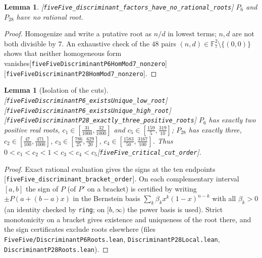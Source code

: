 \documentclass[10pt]{article}
\newtheorem{lemma}[theorem]{Lemma}
\theoremstyle{definition}
\theoremstyle{remark}
\newcommand{\F}{\mathbb{F}}
\newcommand{\leanref}[1]{{\scriptsize\textup{[\texttt{#1}]}}\allowbreak}
\newcommand{\leanfile}[1]{\texttt{\small #1}}
\begin{document}
\begin{lemma}\label{lem:norational}
\leanref{five\allowbreak Five\_\allowbreak discriminant\_\allowbreak factors\_\allowbreak have\_\allowbreak no\_\allowbreak rational\_\allowbreak roots}
$P_6$ and $P_{28}$ have no rational root.
\end{lemma}
\begin{proof}
Homogenize and write a putative root as $n/d$ in lowest terms; $n,d$ are not
both divisible by $7$.  An exhaustive check of the $48$ pairs
$(n,d)\in\F_7^2\setminus\{(0,0)\}$ shows that neither homogeneous form
vanishes\leanref{five\allowbreak Five\allowbreak Discriminant\allowbreak P6\allowbreak Hom\allowbreak Mod7\_\allowbreak nonzero} \leanref{five\allowbreak Five\allowbreak Discriminant\allowbreak P28\allowbreak Hom\allowbreak Mod7\_\allowbreak nonzero}.
\end{proof}

\begin{lemma}[Isolation of the cuts]\label{lem:cuts}
\leanref{five\allowbreak Five\allowbreak Discriminant\allowbreak P6\_\allowbreak exists\allowbreak Unique\_\allowbreak low\_\allowbreak root} \leanref{five\allowbreak Five\allowbreak Discriminant\allowbreak P6\_\allowbreak exists\allowbreak Unique\_\allowbreak high\_\allowbreak root} \leanref{five\allowbreak Five\allowbreak Discriminant\allowbreak P28\_\allowbreak exactly\_\allowbreak three\_\allowbreak positive\_\allowbreak roots}
$P_6$ has exactly two positive real roots, $c_1\in[\tfrac{31}{1000},\tfrac{32}{1000}]$
and $c_5\in[\tfrac{159}{5},\tfrac{319}{10}]$; $P_{28}$ has exactly three,
$c_2\in[\tfrac{47}{100},\tfrac{471}{1000}]$, $c_3\in[\tfrac{786}{25},\tfrac{629}{20}]$,
$c_4\in[\tfrac{1583}{50},\tfrac{3167}{100}]$.  Thus
$0<c_1<c_2<1<c_3<c_4<c_5$\leanref{five\allowbreak Five\_\allowbreak critical\_\allowbreak cut\_\allowbreak order}.
\end{lemma}
\begin{proof}
Exact rational evaluation gives the signs at the ten endpoints
\leanref{five\allowbreak Five\_\allowbreak discriminant\_\allowbreak bracket\_\allowbreak order}.  On each complementary
interval $[a,b]$ the sign of $P$ (of $P'$ on a bracket) is certified by
writing $\pm P(a+(b-a)x)$ in the Bernstein basis $\sum_k\beta_kx^k(1-x)^{n-k}$
with all $\beta_k>0$ (an identity checked by \texttt{ring}; on $[b,\infty)$
the power basis is used).  Strict monotonicity on a bracket gives existence
and uniqueness of the root there, and the sign certificates exclude roots
elsewhere (files \leanfile{Five\allowbreak Five/\allowbreak Discriminant\allowbreak P6\allowbreak Roots.\allowbreak lean},
\leanfile{Discriminant\allowbreak P28\allowbreak Local.\allowbreak lean}, \leanfile{Discriminant\allowbreak P28\allowbreak Roots.\allowbreak lean}).
\end{proof}
\end{document}

